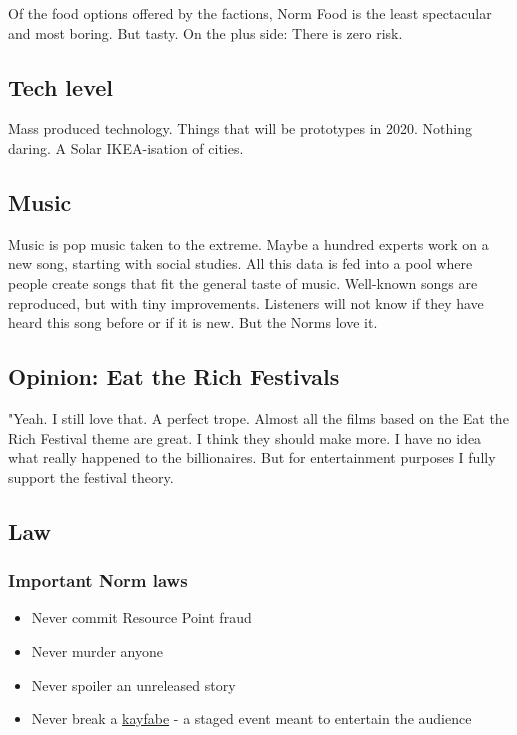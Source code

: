 Of the food options offered by the factions, Norm Food is the least spectacular and most boring. But tasty. On the plus side: There is zero risk.

\subsection{Tech level}

Mass produced technology. Things that will be prototypes in 2020. Nothing daring. A Solar IKEA-isation of cities.

\subsection{Music}

Music is pop music taken to the extreme. Maybe a hundred experts work on a new song, starting with social studies. All this data is fed into a pool where people create songs that fit the general taste of music. Well-known songs are reproduced, but with tiny improvements. Listeners will not know if they have heard this song before or if it is new. But the Norms love it.

\subsection{Opinion: Eat the Rich Festivals}

"Yeah. I still love that. A perfect trope. Almost all the films based on the Eat the Rich Festival theme are great. I think they should make more. I have no idea what really happened to the billionaires. But for entertainment purposes I fully support the festival theory.

\subsection{Law}
\label{sec: norm law}

\subsubsection{Important Norm laws}

\begin{itemize}
\item{Never commit Resource Point fraud}
\item{Never murder anyone}
\item{Never spoiler an unreleased story}
\item{Never break a \href{https://en.wikipedia.org/wiki/Kayfabe}{kayfabe} - a staged event meant to entertain the audience}
\end{itemize}


